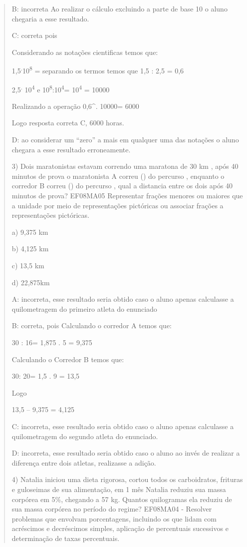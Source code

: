 \begin{quote}
\begin{escolha}
B: incorreta Ao realizar o cálculo excluindo a parte de base 10 o aluno
chegaria a esse resultado.

C: correta pois

Considerando as notações cientificas temos que:

1,5\textsuperscript{.}10\textsuperscript{8} = separando os termos temos
que 1,5 : 2,5 = 0,6

2,5\textsuperscript{.} 10\textsuperscript{4} e
10\textsuperscript{8}:10\textsuperscript{4}= 10\textsuperscript{4} =
10000

Realizando a operação 0,6^{.} 10000= 6000

Logo resposta correta C, 6000 horas.

D: ao considerar um ``zero'' a mais em qualquer uma das notações o aluno
chegara a esse resultado erroneamente.

3) Dois maratonistas estavam correndo uma maratona de 30 km , após 40
minutos de prova o maratonista A correu () do percurso ,
enquanto o corredor B correu () do percurso , qual a
distancia entre os dois após 40 minutos de prova? EF08MA05 Representar
frações menores ou maiores que a unidade por meio de representações
pictóricas ou associar frações a representações pictóricas.

a) 9,375 km

b) 4,125 km

c) 13,5 km

d) 22,875km

A: incorreta, esse resultado seria obtido caso o aluno apenas calculasse
a quilometragem do primeiro atleta do enunciado

B: correta, pois Calculando o corredor A temos que:

30 : 16= 1,875 . 5 = 9,375

Calculando o Corredor B temos que:

30: 20= 1,5 . 9 = 13,5

Logo

13,5 -- 9,375 = 4,125

C: incorreta, esse resultado seria obtido caso o aluno apenas calculasse
a quilometragem do segundo atleta do enunciado.

D: incorreta, esse resultado seria obtido caso o aluno ao invés de
realizar a diferença entre dois atletas, realizasse a adição.

4) Natalia iniciou uma dieta rigorosa, cortou todos os carboidratos,
frituras e guloseimas de sua alimentação, em 1 mês Natalia reduziu sua
massa corpórea em 5\%, chegando a 57 kg. Quantos quilogramas ela reduziu
de sua massa corpórea no período do regime? EF08MA04 - Resolver
problemas que envolvam porcentagens, incluindo os que lidam com
acréscimos e decréscimos simples, aplicação de percentuais sucessivos e
determinação de taxas percentuais.


\end{escolha}
\end{quote}
